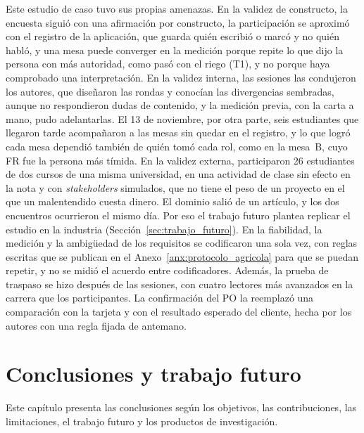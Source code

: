 \documentclass[12pt,letterpaper,oneside]{report}
\begin{document}
Este estudio de caso tuvo sus propias amenazas. En la validez de
constructo, la encuesta siguió con una afirmación por constructo, la
participación se aproximó con el registro de la aplicación, que guarda quién
escribió o marcó y no quién habló, y
una mesa puede converger en la medición porque repite lo que dijo la persona con
más autoridad, como pasó con el riego (T1), y no porque haya comprobado una
interpretación. En la validez interna, las sesiones las condujeron los autores,
que diseñaron las rondas y conocían las divergencias sembradas, aunque no
respondieron dudas de contenido, y la medición previa, con la carta a mano, pudo
adelantarlas. El 13 de noviembre, por otra parte, seis estudiantes que llegaron
tarde acompañaron a las mesas sin quedar en el registro, y lo que logró cada mesa
dependió también de quién tomó cada rol, como en la mesa~B, cuyo FR fue la persona
más tímida. En la validez externa, participaron 26 estudiantes de dos cursos de
una misma universidad, en una actividad de clase sin efecto en la nota y con
\textit{stakeholders} simulados, que no tiene el peso de un proyecto en el que
un malentendido cuesta dinero. El dominio salió de un artículo, y los dos
encuentros ocurrieron el mismo día. Por eso el trabajo futuro plantea replicar
el estudio en la industria (Sección~\ref{sec:trabajo_futuro}). En la fiabilidad, la medición y la ambigüedad de
los requisitos se codificaron una sola vez, con reglas escritas que se publican
en el Anexo~\ref{anx:protocolo_agricola} para que se puedan repetir, y no se
midió el acuerdo entre codificadores. Además, la prueba de traspaso se hizo después de las
sesiones, con cuatro lectores más avanzados en la carrera que
los participantes. La confirmación del PO la reemplazó una comparación con la
tarjeta y con el resultado esperado del cliente, hecha por los autores con una
regla fijada de antemano.


\chapter{Conclusiones y trabajo futuro}
\label{ch:conclusiones}

Este capítulo presenta las conclusiones según los objetivos, las
contribuciones, las limitaciones, el trabajo futuro y los productos de
investigación.
\end{document}
